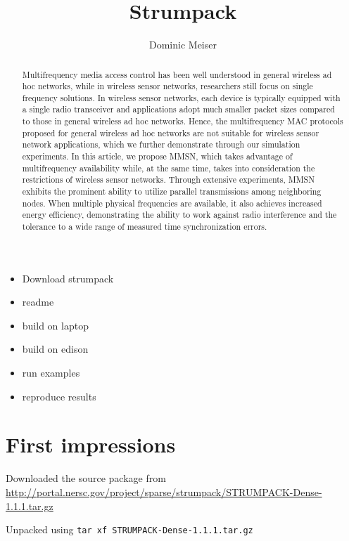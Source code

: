 \documentclass{acmsmall}
\begin{document}
\title{Strumpack}
\author{Dominic Meiser
}


\begin{abstract}
Multifrequency media access control has been well understood in
general wireless ad hoc networks, while in wireless sensor networks,
researchers still focus on single frequency solutions. In wireless
sensor networks, each device is typically equipped with a single
radio transceiver and applications adopt much smaller packet sizes
compared to those in general wireless ad hoc networks. Hence, the
multifrequency MAC protocols proposed for general wireless ad hoc
networks are not suitable for wireless sensor network applications,
which we further demonstrate through our simulation experiments. In
this article, we propose MMSN, which takes advantage of
multifrequency availability while, at the same time, takes into
consideration the restrictions of wireless sensor networks. Through
extensive experiments, MMSN exhibits the prominent ability to utilize
parallel transmissions among neighboring nodes. When multiple physical
frequencies are available, it also achieves increased energy
efficiency, demonstrating the ability to work against radio
interference and the tolerance to a wide range of measured time
synchronization errors.
\end{abstract}

\maketitle 

\begin{itemize}
  \item Download strumpack
  \item readme
  \item build on laptop
  \item build on edison
  \item run examples
  \item reproduce results

\end{itemize}

\section{First impressions}

Downloaded the source package from
\url{http://portal.nersc.gov/project/sparse/strumpack/STRUMPACK-Dense-1.1.1.tar.gz}

Unpacked using \verb!tar xf STRUMPACK-Dense-1.1.1.tar.gz!
\end{document}
